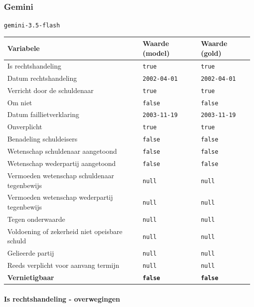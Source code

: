 \documentclass[
  dutch,
  a4paper,
]{article}
\begin{document}

\subsubsection{Gemini}\label{gemini-20}

\texttt{gemini-3.5-flash}

\begin{center}
\small
\begin{tabular}{@{}p{7.4cm}p{2.6cm}p{2.6cm}@{}}
\toprule
Variabele & Waarde (model) & Waarde (gold) \\
\midrule
Is rechtshandeling & \texttt{true} & \texttt{true} \\
Datum rechtshandeling & \texttt{2002-04-01} & \texttt{2002-04-01} \\
Verricht door de schuldenaar & \texttt{true} & \texttt{true} \\
Om niet & \texttt{false} & \texttt{false} \\
Datum faillietverklaring & \texttt{2003-11-19} & \texttt{2003-11-19} \\
Onverplicht & \texttt{true} & \texttt{true} \\
Benadeling schuldeisers & \texttt{false} & \texttt{false} \\
Wetenschap schuldenaar aangetoond & \texttt{false} & \texttt{false} \\
Wetenschap wederpartij aangetoond & \texttt{false} & \texttt{false} \\
Vermoeden wetenschap schuldenaar tegenbewijs & \texttt{null} & \texttt{null} \\
Vermoeden wetenschap wederpartij tegenbewijs & \texttt{null} & \texttt{null} \\
Tegen onderwaarde & \texttt{null} & \texttt{null} \\
Voldoening of zekerheid niet opeisbare schuld & \texttt{null} & \texttt{null} \\
Gelieerde partij & \texttt{null} & \texttt{null} \\
Reeds verplicht voor aanvang termijn & \texttt{null} & \texttt{null} \\
\textbf{Vernietigbaar} & \textbf{\texttt{false}} & \textbf{\texttt{false}} \\
\bottomrule
\end{tabular}
\end{center}

\paragraph{Is rechtshandeling - overwegingen}\label{is-rechtshandeling---overwegingen-62}
\end{document}

